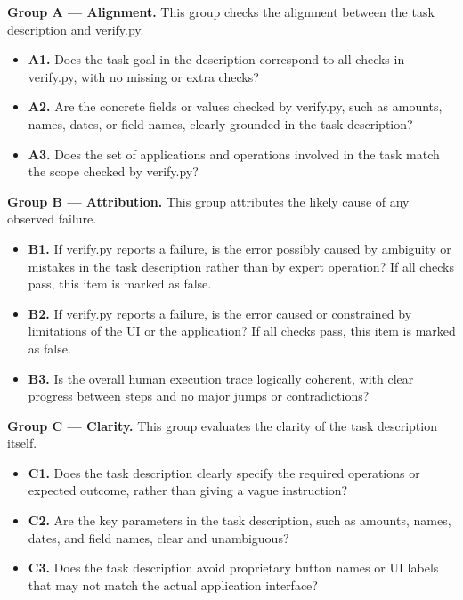 \begin{tcolorbox}[
    title=Execution Check Rubric,
    colback=gray!3,
    colframe=black!45,
    fonttitle=\bfseries,
    breakable
]
\textbf{Group A --- Alignment.}
This group checks the alignment between the task description and {\ttfamily verify.py}.
\begin{itemize}
    \item \textbf{A1.} Does the task goal in the description correspond to all checks in {\ttfamily verify.py}, with no missing or extra checks?
    \item \textbf{A2.} Are the concrete fields or values checked by {\ttfamily verify.py}, such as amounts, names, dates, or field names, clearly grounded in the task description?
    \item \textbf{A3.} Does the set of applications and operations involved in the task match the scope checked by {\ttfamily verify.py}?
\end{itemize}

\textbf{Group B --- Attribution.}
This group attributes the likely cause of any observed failure.
\begin{itemize}
    \item \textbf{B1.} If {\ttfamily verify.py} reports a failure, is the error possibly caused by ambiguity or mistakes in the task description rather than by expert operation? If all checks pass, this item is marked as false.
    \item \textbf{B2.} If {\ttfamily verify.py} reports a failure, is the error caused or constrained by limitations of the UI or the application? If all checks pass, this item is marked as false.
    \item \textbf{B3.} Is the overall human execution trace logically coherent, with clear progress between steps and no major jumps or contradictions?
\end{itemize}

\textbf{Group C --- Clarity.}
This group evaluates the clarity of the task description itself.
\begin{itemize}
    \item \textbf{C1.} Does the task description clearly specify the required operations or expected outcome, rather than giving a vague instruction?
    \item \textbf{C2.} Are the key parameters in the task description, such as amounts, names, dates, and field names, clear and unambiguous?
    \item \textbf{C3.} Does the task description avoid proprietary button names or UI labels that may not match the actual application interface?
\end{itemize}
\end{tcolorbox}

